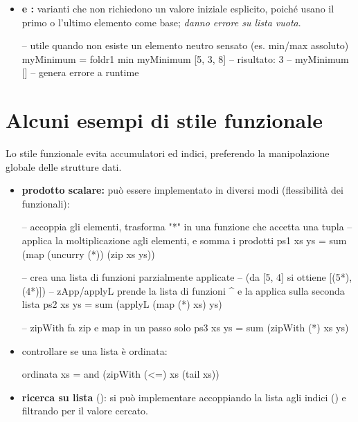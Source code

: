 \begin{itemize}
\begin{haskellbox}{}
-- sottrazione con foldr per confronto
foldr (-) 0 [1, 2, 3]
-- valutazione: 1 - (2 - (3 - 0)) = 2

-- reverse usando foldl
myReverse xs = foldl (\acc x -> x : acc) [] xs
\end{haskellbox}

    \item \textbf{ e :} varianti che non richiedono un valore iniziale esplicito, poiché usano il primo o l'ultimo elemento come base; \textit{danno errore su lista vuota}.
\begin{haskellbox}{}
-- utile quando non esiste un elemento neutro sensato (es. min/max assoluto)
myMinimum = foldr1 min
myMinimum [5, 3, 8] -- risultato: 3
-- myMinimum []     -- genera errore a runtime
\end{haskellbox}{}
\end{itemize}

\section{Alcuni esempi di stile funzionale}
Lo stile funzionale evita accumulatori ed indici, preferendo la manipolazione globale delle strutture dati.

\begin{itemize}
    \item \textbf{prodotto scalare:} può essere implementato in diversi modi (flessibilità dei funzionali):

\begin{haskellbox}{}
-- accoppia gli elementi, trasforma "*" in una funzione che accetta una tupla
-- applica la moltiplicazione agli elementi, e somma i prodotti
ps1 xs ys = sum (map (uncurry (*)) (zip xs ys))

-- crea una lista di funzioni parzialmente applicate
-- (da [5, 4] si ottiene [(5*), (4*)])
-- zApp/applyL prende la lista di funzioni ^ e la applica sulla seconda lista
ps2 xs ys = sum (applyL (map (*) xs) ys)

-- zipWith fa zip e map in un passo solo
ps3 xs ys = sum (zipWith (*) xs ys)
\end{haskellbox}

    \item controllare se una lista è ordinata:
\begin{haskellbox}{}
ordinata xs = and (zipWith (<=) xs (tail xs))
\end{haskellbox}

\item \textbf{ricerca su lista} (): si può implementare accoppiando la lista agli indici () e filtrando per il valore cercato.
\end{itemize}
